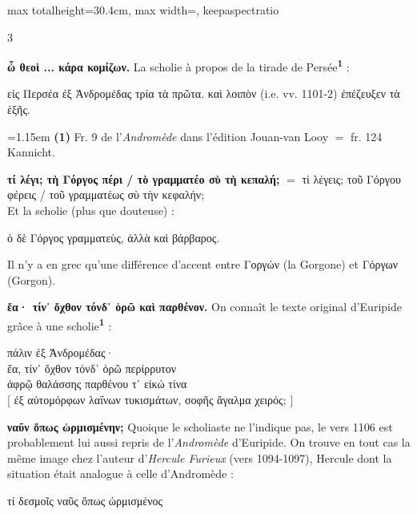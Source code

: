 \documentclass[11pt,twoside]{book}
\newcommand{\italique}[1]{\textit{#1}}
\newcommand{\citComm}[1]{\begin{quoting}[vskip=0.4pt,leftmargin=0.7em,rightmargin=0.2em]#1\end{quoting}}
\newcommand{\marqueur}[1]{\textsuperscript{\color{rubricRed}\textbf{#1}}}
\begin{document}
\begin{adjustbox}{max totalheight=30.4cm, max width=\textwidth, keepaspectratio}
\begin{minipage}{\textwidth}
{\begin{multicols}{3}
\par\vspace{1.5pt}
 \textbf{ὦ θεοὶ ... κάρα κομίζων.} La scholie à propos de la tirade de Persée\marqueur{1} :
\citComm{εἰς Περσέα ἐξ Ἀνδρομέδας τρία τὰ πρῶτα. καὶ λοιπὸν (i.e. vv. 1101-2) ἐπέζευξεν τὰ ἑξῆς.}
\par\vspace{1.5pt}
\par\vspace{1.2pt}\par\nopagebreak\vspace{1pt}\noindent\hangindent=1.15em {\color{sepiaNote}\textbf{(1)}} Fr. 9 de l'\italique{Andromède} dans l'édition Jouan-van Looy $=$ fr. 124 Kannicht.
\par\vspace{1.5pt}
 \textbf{τί λέγι; τὴ Γόργος πέρι / τὸ γραμματέο σὺ τὴ κεπαλή;} $=$ τί λέγεις; τοῦ Γόργου φέρεις / τοῦ γραμματέως σὺ τὴν κεφαλήν;\\ Et la scholie (plus que douteuse) :
\citComm{ὁ δὲ Γόργος γραμματεὺς, ἀλλὰ καὶ βάρβαρος.}
\par\vspace{1.5pt}
\noindent Il n'y a en grec qu'une différence d'accent entre Γοργών (la Gorgone) et Γόργων (Gorgon).
\par\vspace{1.5pt}
 \textbf{ἔα· τίν᾽ ὄχθον τόνδ᾽ ὁρῶ καὶ παρθένον.} On connaît le texte original d'Euripide grâce à une scholie\marqueur{1} :
\citComm{πάλιν ἐξ Ἀνδρομέδας·\\
ἔα, τίν᾽ ὄχθον τόνδ᾽ ὁρῶ περίρρυτον\\
ἀφρῷ θαλάσσης παρθένου τ᾽ εἰκώ τίνα\\
$[$ ἐξ αὐτομόρφων λαΐνων τυκισμάτων,
σοφῆς ἄγαλμα χειρός; $]$ }
\par\vspace{1.5pt}
 \textbf{ναῦν ὅπως ὡρμισμένην;} Quoique le scholiaste ne l'indique pas, le vers 1106 est probablement lui aussi repris de l'\italique{Andromède} d'Euripide. On trouve en tout cas la même image chez l'auteur d'\italique{Hercule Furieux} (vers 1094-1097), Hercule dont la situation était analogue à celle d'Andromède :
\citComm{τί δεσμοῖς ναῦς ὅπως ὡρμισμένος\\
}
\end{multicols}}
\end{minipage}
\end{adjustbox}
\end{document}
